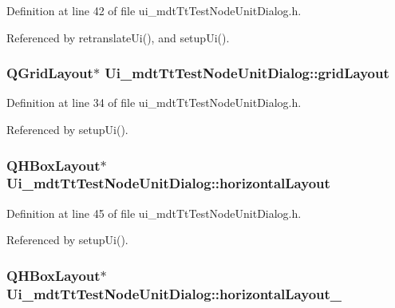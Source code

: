 Definition at line 42 of file ui\-\_\-mdt\-Tt\-Test\-Node\-Unit\-Dialog.\-h.



Referenced by retranslate\-Ui(), and setup\-Ui().

\hypertarget{class_ui__mdt_tt_test_node_unit_dialog_a419b2d2d74bbf4b4aeaf0bb4e5357e22}{
\subsubsection[{grid\-Layout}]{\setlength{\rightskip}{0pt plus 5cm}Q\-Grid\-Layout$\ast$ Ui\-\_\-mdt\-Tt\-Test\-Node\-Unit\-Dialog\-::grid\-Layout}}\label{class_ui__mdt_tt_test_node_unit_dialog_a419b2d2d74bbf4b4aeaf0bb4e5357e22}


Definition at line 34 of file ui\-\_\-mdt\-Tt\-Test\-Node\-Unit\-Dialog.\-h.



Referenced by setup\-Ui().

\hypertarget{class_ui__mdt_tt_test_node_unit_dialog_a9345e7e3a9981e02463d165fe7098576}{
\subsubsection[{horizontal\-Layout}]{\setlength{\rightskip}{0pt plus 5cm}Q\-H\-Box\-Layout$\ast$ Ui\-\_\-mdt\-Tt\-Test\-Node\-Unit\-Dialog\-::horizontal\-Layout}}\label{class_ui__mdt_tt_test_node_unit_dialog_a9345e7e3a9981e02463d165fe7098576}


Definition at line 45 of file ui\-\_\-mdt\-Tt\-Test\-Node\-Unit\-Dialog.\-h.



Referenced by setup\-Ui().

\hypertarget{class_ui__mdt_tt_test_node_unit_dialog_af6e88195fbfdaa9840013e51acfbc08d}{
\subsubsection[{horizontal\-Layout\-\_\-2}]{\setlength{\rightskip}{0pt plus 5cm}Q\-H\-Box\-Layout$\ast$ Ui\-\_\-mdt\-Tt\-Test\-Node\-Unit\-Dialog\-::horizontal\-Layout\-\_}}\label{class_ui__mdt_tt_test_node_unit_dialog_af6e88195fbfdaa9840013e51acfbc08d}


